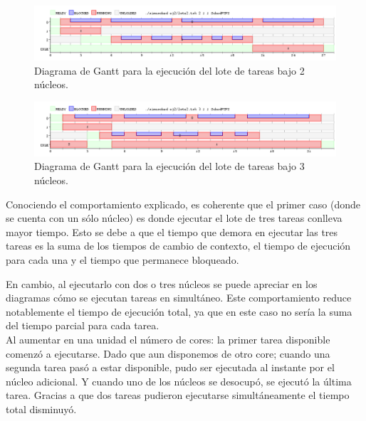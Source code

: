 \documentclass[a4paper]{article}
\begin{document}
 \begin{figure}[h!]
   \begin{center}
 	\includegraphics[scale=0.5]{imagenes/ej2/2core.png}
 	\caption{Diagrama de Gantt para la ejecuci\'on del lote de tareas bajo 2 n\'ucleos.}
   \end{center}
 \end{figure} 
 
  \newpage

  \begin{figure}[h!]
   \begin{center}
 	\includegraphics[scale=0.5]{imagenes/ej2/3core.png}
 	\caption{Diagrama de Gantt para la ejecuci\'on del lote de tareas bajo 3 n\'ucleos.}
   \end{center}
 \end{figure} 


Conociendo el comportamiento explicado, es coherente que el primer caso (donde se cuenta con un s\'olo n\'ucleo) es donde ejecutar el lote de tres tareas conlleva mayor tiempo. Esto se debe a que el tiempo que demora en ejecutar las tres tareas es la suma de los tiempos de cambio de contexto, el tiempo de ejecuci\'on para cada una y el tiempo que permanece bloqueado.

En cambio, al ejecutarlo con dos o tres n\'ucleos se puede apreciar en los diagramas c\'omo se ejecutan tareas en simult\'aneo. Este comportamiento reduce notablemente el tiempo de ejecuci\'on total, ya que en este caso no ser\'ia la suma del tiempo parcial para cada tarea.\\

Al aumentar en una unidad el número de cores: la primer tarea disponible comenzó a ejecutarse. Dado que aun disponemos de otro core; cuando una segunda tarea pas\'o a estar disponible, pudo ser ejecutada al instante por el núcleo adicional. Y cuando uno de los n\'ucleos se desocupó, se ejecutó la última tarea. Gracias a que dos tareas pudieron ejecutarse simult\'aneamente el tiempo total disminuyó. 
\end{document}
